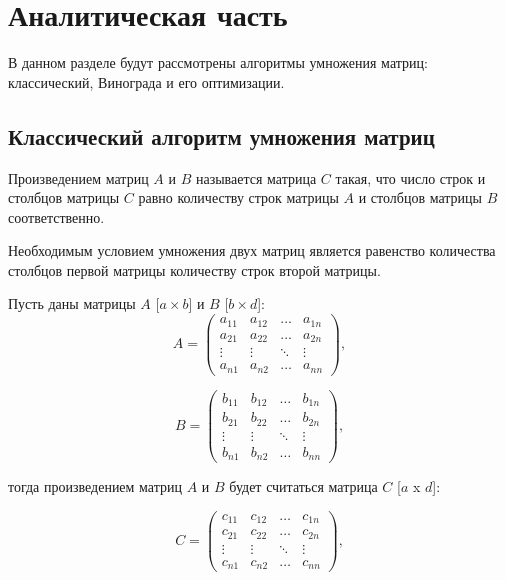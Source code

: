 \chapter{Аналитическая часть}
В данном разделе будут рассмотрены алгоритмы умножения матриц: классический, Винограда и его оптимизации.

\section{Классический алгоритм умножения матриц}

Произведением матриц $A$ и $B$ называется матрица $C$ такая, что число строк и столбцов матрицы $C$ равно количеству строк матрицы $A$ и столбцов матрицы $B$ соответственно.

Необходимым условием умножения двух матриц является равенство количества столбцов первой матрицы количеству строк второй матрицы.

Пусть даны матрицы $A$ [$a\times b$] и $B$ [$b\times d$]:
\begin{equation}
	A = \left(
	\begin{array}{cccc}
		a_{11} & a_{12} & \ldots & a_{1n}\\
		a_{21} & a_{22} & \ldots & a_{2n}\\
		\vdots & \vdots & \ddots & \vdots\\
		a_{n1} & a_{n2} & \ldots & a_{nn}
	\end{array}
	\right),
\end{equation}

\begin{equation}
	B = \left(
	\begin{array}{cccc}
		b_{11} & b_{12} & \ldots & b_{1n}\\
		b_{21} & b_{22} & \ldots & b_{2n}\\
		\vdots & \vdots & \ddots & \vdots\\
		b_{n1} & b_{n2} & \ldots & b_{nn}
	\end{array}
	\right),
\end{equation}

тогда произведением матриц $A$ и $B$ будет считаться матрица $C$ [$a$ x $d$]:

\begin{equation}
	C = \left(
	\begin{array}{cccc}
		c_{11} & c_{12} & \ldots & c_{1n}\\
		c_{21} & c_{22} & \ldots & c_{2n}\\
		\vdots & \vdots & \ddots & \vdots\\
		c_{n1} & c_{n2} & \ldots & c_{nn}
	\end{array}
	\right),
\end{equation}


